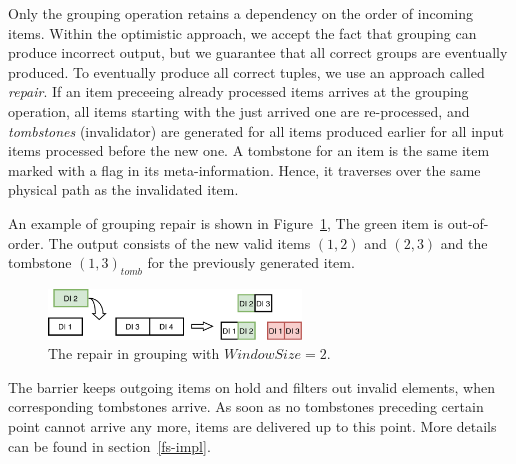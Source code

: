 Only the grouping operation retains a dependency on the order of incoming items. 
%
Within the  optimistic approach, we accept the fact that grouping can produce incorrect output, but we guarantee that all correct groups are eventually produced. 
To eventually produce all correct tuples, we use an approach called {\it repair}. 
If an item preceeing already processed items arrives at the grouping operation, all items starting with the just arrived one are re-processed, and {\em tombstones} (invalidator) are generated for all items produced earlier for all input items processed before the new one. A tombstone for an item is the same item marked with a flag in its meta-information. Hence, it traverses over the same physical path as the invalidated item.

An example of grouping repair is shown in Figure~\ref{grouping-replaying}, 
The green item is out-of-order. 
The output consists of the new valid items  $(1, 2)$ and $(2, 3)$  and the tombstone $(1, 3)_{tomb}$ for the previously generated item.

\begin{figure}[ht]
  \centering
  \includegraphics[width=0.6\textwidth]{pics/grouping-replaying}
  \caption{The repair in grouping with $WindowSize = 2$. %
  }
  \label {grouping-replaying}
\end{figure}


The barrier  keeps outgoing items on hold and filters out invalid elements, when corresponding tombstones arrive. 
As soon as no tombstones preceding certain point cannot arrive any more, items are delivered  up to this point. 
%
More details can be found  in section~\ref{fs-impl}.


